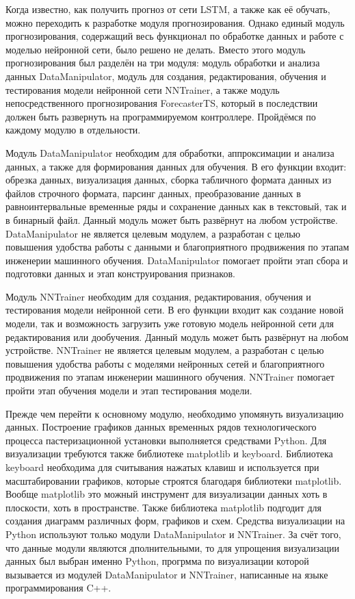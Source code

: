 \subtitlespace
  
{\gostFont

  \par \redline Когда известно, как получить прогноз от сети LSTM, а также как её обучать, можно переходить к разработке модуля прогнозирования. Однако единый модуль прогнозирования, содержащий весь функционал по обработке данных и работе с моделью нейронной сети, было решено не делать. Вместо этого модуль прогнозирования был разделён на три модуля: модуль обработки и анализа данных DataManipulator, модуль для создания, редактирования, обучения и тестирования модели нейронной сети NNTrainer, а также модуль непосредственного прогнозирования ForecasterTS, который в последствии должен быть развернуть на программируемом контроллере. Пройдёмся по каждому модулю в отдельности. 

  \par \redline Модуль DataManipulator необходим для обработки, аппроксимации и анализа данных, а также для формирования данных для обучения. В его функции входит: обрезка данных, визуализация данных, сборка табличного формата данных из файлов строчного формата, парсинг данных, преобразование данных в равноинтервальные временные ряды и сохранение данных как в текстовый, так и в бинарный файл. Данный модуль может быть развёрнут на любом устройстве. DataManipulator не является целевым модулем, а разработан с целью повышения удобства работы с данными и благоприятного продвижения по этапам инженерии машинного обучения. DataManipulator помогает пройти этап сбора и подготовки данных и этап конструирования признаков. 

  \par \redline Модуль NNTrainer необходим для создания, редактирования, обучения и тестирования модели нейронной сети. В его функции входит как создание новой модели, так и возможность загрузить уже готовую модель нейронной сети для редактирования или дообучения. Данный модуль может быть развёрнут на любом устройстве. NNTrainer не является целевым модулем, а разработан с целью повышения удобства работы с моделями нейронных сетей и благоприятного продвижения по этапам инженерии машинного обучения. NNTrainer помогает пройти этап обучения модели и этап тестирования модели.
  
  \par \redline Прежде чем перейти к основному модулю, необходимо упомянуть визуализацию данных. Построение графиков данных временных рядов технологического процесса пастеризационной установки выполняется средствами Python. Для визуализации требуются также библиотеке matplotlib и keyboard. Библиотека keyboard необходима для считывания нажатых клавиш и используется при масштабировании графиков, которые строятся благодаря библиотеки matplotlib. Вообще matplotlib это можный инструмент для визуализации данных хоть в плоскости, хоть в пространстве. Также библиотека matplotlib подгодит для создания диаграмм различных форм, графиков и схем. Средства визуализации на Python используют только модули DataManipulator и NNTrainer. За счёт того, что данные модули являются дполнительными, то для упрощения визуализации данных был выбран именно Python, прогрмма по визуализации которой вызывается из модулей DataManipulator и NNTrainer, написанные на языке программирования C++.

}
